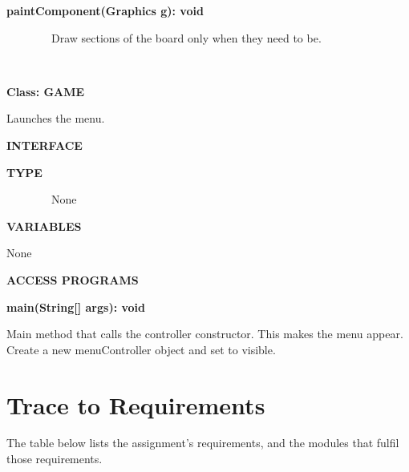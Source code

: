 \documentclass{article}
\begin{document}
{{}

{\textbf{paintComponent(Graphics g): void}}

{~~~~~~~~Draw sections of the board only when they need to
be.}

{~~~~~~~~~~~~~~~~}

{}

{\textbf{Class: GAME}}

{Launches the menu.}

{\textbf{INTERFACE}}

{\textbf{TYPE}}

{~~~~~~~~None}

{\textbf{VARIABLES}}

{None}

{\textbf{ACCESS PROGRAMS}}

{\textbf{main(String{[}{]} args): void}}

{Main method that calls the controller constructor. This makes the menu
appear. Create a new menuController object and set to visible.}

\section{Trace to Requirements}
The table below lists the assignment's requirements, and the modules that fulfil those requirements.

}
\end{document}
